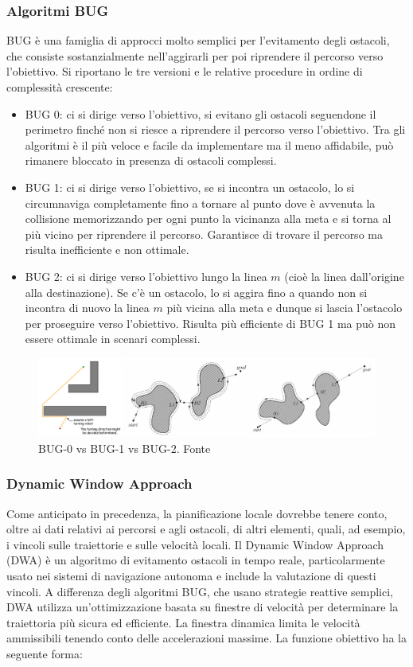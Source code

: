 \subsubsection{Algoritmi BUG}
BUG è una famiglia di approcci molto semplici per l'evitamento degli ostacoli, che consiste sostanzialmente nell'aggirarli per poi riprendere il percorso verso l'obiettivo. Si riportano le tre versioni e le relative procedure in ordine di complessità crescente:
\begin{itemize}
    \item BUG 0: ci si dirige verso l'obiettivo, si evitano gli ostacoli seguendone il perimetro finché non si riesce a riprendere il percorso verso l'obiettivo. Tra gli algoritmi è il più veloce e facile da implementare ma il meno affidabile, può rimanere bloccato in presenza di ostacoli complessi.
    \item BUG 1: ci si dirige verso l'obiettivo, se si incontra un ostacolo, lo si circumnaviga completamente fino a tornare al punto dove è avvenuta la collisione memorizzando per ogni punto la vicinanza alla meta e si torna al più vicino per riprendere il percorso. Garantisce di trovare il percorso ma risulta inefficiente e non ottimale.
    \item BUG 2: ci si dirige verso l'obiettivo lungo la linea $m$ (cioè la linea dall'origine alla destinazione). Se c'è un ostacolo, lo si aggira fino a quando non si incontra di nuovo la linea $m$ più vicina alla meta e dunque si lascia l'ostacolo per proseguire verso l'obiettivo. Risulta più efficiente di BUG 1 ma può non essere ottimale in scenari complessi.
\end{itemize}

\begin{figure}[h]
    \centering
    \includegraphics[width=1\linewidth]{immagini/bug_alg.png}
    \caption{BUG-0 vs BUG-1 vs BUG-2. Fonte \cite{choudhury2020design}}
    \label{fig:BUG}
\end{figure}


\subsubsection{Dynamic Window Approach}
Come anticipato in precedenza, la pianificazione locale dovrebbe tenere conto, oltre ai dati relativi ai percorsi e agli ostacoli, di altri elementi, quali, ad esempio, i vincoli sulle traiettorie e sulle velocità locali. Il Dynamic Window Approach (DWA) è un algoritmo di evitamento ostacoli in tempo reale, particolarmente usato nei sistemi di navigazione autonoma e include la valutazione di questi vincoli. A differenza degli algoritmi BUG, che usano strategie reattive semplici, DWA utilizza un'ottimizzazione basata su finestre di velocità per determinare la traiettoria più sicura ed efficiente. La finestra dinamica limita le velocità ammissibili tenendo conto delle accelerazioni massime. La funzione obiettivo ha la seguente forma:

